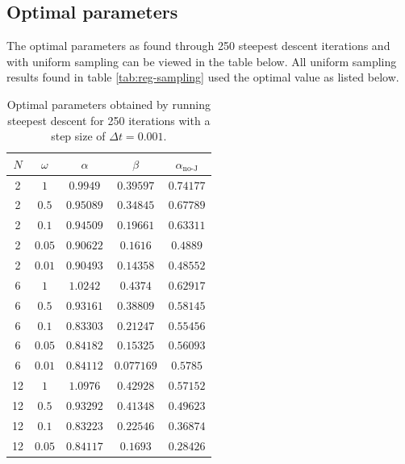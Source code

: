 \documentclass[11pt]{article}
\begin{document}
\subsection{Optimal parameters}
The optimal parameters as found through 250 steepest descent iterations and with uniform sampling can be viewed in the table below. All uniform sampling results found in table \ref{tab:reg-sampling} used the optimal value as listed below.

\begin{table}[H]
	\centering
	\caption{Optimal parameters obtained by running steepest descent for 250 iterations with a step size of $\Delta t = 0.001$.}
	\begin{tabular}{c c c c c}
		\\ \hline \hline
		$N$ &       $\omega$ &       $\alpha$ &        $\beta$ &$\alpha_\text{no-J}$ \\ \hline
		2 &$              1$ &$         0.9949$ &$        0.39597$ &$        0.74177$ \\ 
		2 &$            0.5$ &$        0.95089$ &$        0.34845$ &$        0.67789$ \\ 
		2 &$            0.1$ &$        0.94509$ &$        0.19661$ &$        0.63311$ \\ 
		2 &$           0.05$ &$        0.90622$ &$         0.1616$ &$         0.4889$ \\ 
		2 &$           0.01$ &$        0.90493$ &$        0.14358$ &$        0.48552$ \\ 
		6 &$              1$ &$         1.0242$ &$         0.4374$ &$        0.62917$ \\ 
		6 &$            0.5$ &$        0.93161$ &$        0.38809$ &$        0.58145$ \\ 
		6 &$            0.1$ &$        0.83303$ &$        0.21247$ &$        0.55456$ \\ 
		6 &$           0.05$ &$        0.84182$ &$        0.15325$ &$        0.56093$ \\ 
		6 &$           0.01$ &$        0.84112$ &$       0.077169$ &$         0.5785$ \\ 
		12 &$              1$ &$         1.0976$ &$        0.42928$ &$        0.57152$ \\ 
		12 &$            0.5$ &$        0.93292$ &$        0.41348$ &$        0.49623$ \\ 
		12 &$            0.1$ &$        0.83223$ &$        0.22546$ &$        0.36874$ \\ 
		12 &$           0.05$ &$        0.84117$ &$         0.1693$ &$        0.28426$ \\ 

\end{tabular}
\end{table}
\end{document}
